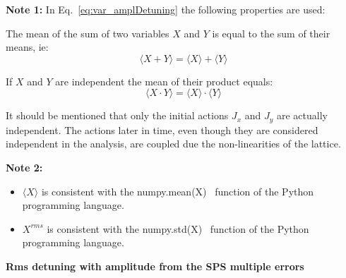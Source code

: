\textbf{Note 1:} In Eq.~\ref{eq:var_amplDetuning} the following properties are used:

The mean of the sum of two variables $X$ and $Y$ is equal to the sum of their means, ie:
\begin{equation}\label{eq:mean_of_sum_property}
    \langle X+Y \rangle = \langle X \rangle + \langle Y \rangle
\end{equation}

If $X$ and $Y$ are independent the mean of their product equals:
\begin{equation}\label{eq:mean_of_product_property}
    \langle X \cdot Y \rangle = \langle X \rangle \cdot  \langle Y \rangle
\end{equation}

It should be mentioned that only the initial actions $J_x$ and $J_y$ are actually independent. The actions later in time, even though they are considered independent in the analysis, are coupled due the non-linearities of the lattice.

\textbf{Note 2:}
\begin{itemize}
    \item $\langle X \rangle$ is consistent with the numpy.mean(X)~\cite{numpy_mean} function of the Python programming language.
    \item $X^{rms}$ is consistent with the numpy.std(X)~\cite{numpy_std} function of the Python programming language. 
\end{itemize}



\normalsize{\textbf{Rms detuning with amplitude from the SPS multiple errors}}\\